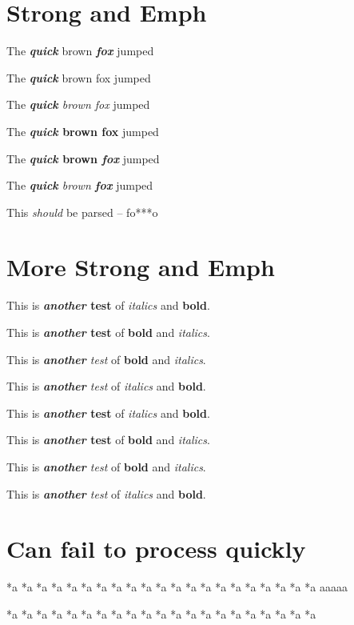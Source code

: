 
\def\mytitle{Edge Cases}


\part{Strong and Emph}
\label{strongandemph}

The \textbf{\emph{quick}} brown \textbf{\emph{fox}} jumped

The \textbf{\emph{quick}} brown fox jumped

The \emph{\textbf{quick} brown fox} jumped

The \textbf{\emph{quick} brown fox} jumped

The \textbf{\emph{quick} brown \emph{fox}} jumped

The \emph{\textbf{quick} brown \textbf{fox}} jumped

This \emph{should} be parsed -- fo***o

\part{More Strong and Emph}
\label{morestrongandemph}

This is \textbf{\emph{another} test} of \emph{italics} and \textbf{bold}.

This is \textbf{\emph{another} test} of \textbf{bold} and \emph{italics}.

This is \emph{\textbf{another} test} of \textbf{bold} and \emph{italics}.

This is \emph{\textbf{another} test} of \emph{italics} and \textbf{bold}.

This is \textbf{\emph{another} test} of \emph{italics} and \textbf{bold}.

This is \textbf{\emph{another} test} of \textbf{bold} and \emph{italics}.

This is \emph{\textbf{another} test} of \textbf{bold} and \emph{italics}.

This is \emph{\textbf{another} test} of \emph{italics} and \textbf{bold}.

\part{Can fail to process quickly}
\label{canfailtoprocessquickly}

*a
*a
*a
*a
*a
*a
*a
*a
*a
*a
*a
*a
*a
*a
*a
*a
*a
*a
*a
*a
*a
aaaaa

*a *a *a *a *a *a *a *a *a *a *a *a *a *a *a *a *a *a *a *a *a 

